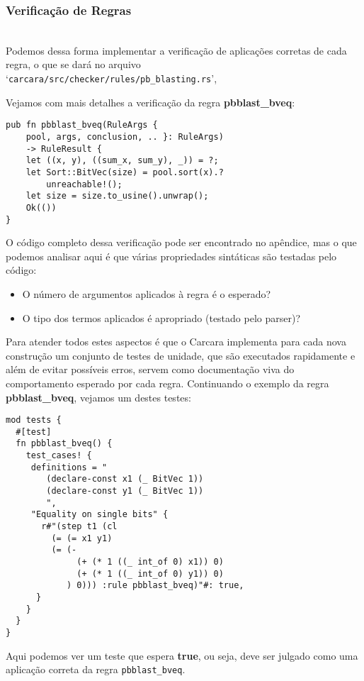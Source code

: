 \documentclass[conference]{IEEEtran}
\begin{document}
\subsubsection{Verificação de Regras}
\noindent\\
Podemos dessa forma implementar a verificação de aplicações corretas de cada regra, o que se
dará no arquivo\\ `\texttt{carcara/src/checker/rules/pb\_blasting.rs}',

Vejamos com mais detalhes a verificação da regra \textbf{pbblast\_bveq}:
\begin{verbatim}
pub fn pbblast_bveq(RuleArgs {
    pool, args, conclusion, .. }: RuleArgs)
    -> RuleResult {
    let ((x, y), ((sum_x, sum_y), _)) = ?;
    let Sort::BitVec(size) = pool.sort(x).?
        unreachable!();
    let size = size.to_usine().unwrap();
    Ok(())
}
\end{verbatim}

O código completo dessa verificação pode ser encontrado no apêndice, mas o que podemos
analisar aqui é que várias propriedades sintáticas são testadas pelo código:
\begin{itemize}
    \item O número de argumentos aplicados à regra é o esperado?
    \item O tipo dos termos aplicados é apropriado (testado pelo parser)?
\end{itemize}

Para atender todos estes aspectos é que o Carcara implementa para cada nova construção um
conjunto de testes de unidade, que são executados rapidamente e além de evitar possíveis erros,
servem como documentação viva do comportamento esperado por cada regra. Continuando o exemplo
da regra \textbf{pbblast\_bveq}, vejamos um destes testes:
\begin{verbatim}
mod tests {
  #[test]
  fn pbblast_bveq() {
    test_cases! {
     definitions = "
        (declare-const x1 (_ BitVec 1))
        (declare-const y1 (_ BitVec 1))
        ",
     "Equality on single bits" {
       r#"(step t1 (cl
         (= (= x1 y1)
         (= (-
              (+ (* 1 ((_ int_of 0) x1)) 0)
              (+ (* 1 ((_ int_of 0) y1)) 0)
            ) 0))) :rule pbblast_bveq)"#: true,
      }
    }
  }
}
\end{verbatim}
Aqui podemos ver um teste que espera \textbf{true}, ou seja, deve ser julgado como uma aplicação
correta da regra \texttt{pbblast\_bveq}.
\end{document}
